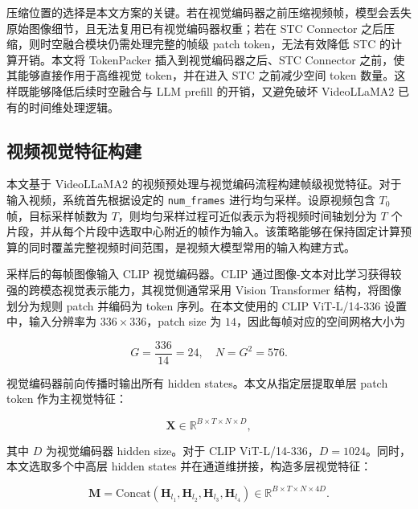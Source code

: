 \par 压缩位置的选择是本文方案的关键。若在视觉编码器之前压缩视频帧，模型会丢失原始图像细节，且无法复用已有视觉编码器权重；若在 STC Connector 之后压缩，则时空融合模块仍需处理完整的帧级 patch token，无法有效降低 STC 的计算开销。本文将 TokenPacker 插入到视觉编码器之后、STC Connector 之前，使其能够直接作用于高维视觉 token，并在进入 STC 之前减少空间 token 数量。这样既能够降低后续时空融合与 LLM prefill 的开销，又避免破坏 VideoLLaMA2 已有的时间维处理逻辑。

\subsection{视频视觉特征构建}

\par 本文基于 VideoLLaMA2 的视频预处理与视觉编码流程构建帧级视觉特征。对于输入视频，系统首先根据设定的 \texttt{num\_frames} 进行均匀采样。设原视频包含 $T_0$ 帧，目标采样帧数为 $T$，则均匀采样过程可近似表示为将视频时间轴划分为 $T$ 个片段，并从每个片段中选取中心附近的帧作为输入。该策略能够在保持固定计算预算的同时覆盖完整视频时间范围，是视频大模型常用的输入构建方式。

\par 采样后的每帧图像输入 CLIP 视觉编码器。CLIP 通过图像-文本对比学习获得较强的跨模态视觉表示能力\cite{clip2021}，其视觉侧通常采用 Vision Transformer 结构，将图像划分为规则 patch 并编码为 token 序列\cite{vit2021}。在本文使用的 CLIP ViT-L/14-336 设置中，输入分辨率为 $336 \times 336$，patch size 为 $14$，因此每帧对应的空间网格大小为

\begin{equation}
    \label{equ:method-raw-grid}
    G = \frac{336}{14}=24,\quad N = G^2 = 576.
\end{equation}

\par 视觉编码器前向传播时输出所有 hidden states。本文从指定层提取单层 patch token 作为主视觉特征：

\begin{equation}
    \label{equ:method-single-feature}
    \mathbf{X} \in \mathbb{R}^{B \times T \times N \times D},
\end{equation}

\par 其中 $D$ 为视觉编码器 hidden size。对于 CLIP ViT-L/14-336，$D=1024$。同时，本文选取多个中高层 hidden states 并在通道维拼接，构造多层视觉特征：

\begin{equation}
    \label{equ:method-multi-feature}
    \mathbf{M} = \mathrm{Concat}(\mathbf{H}_{l_1},\mathbf{H}_{l_2},\mathbf{H}_{l_3},\mathbf{H}_{l_4})
    \in \mathbb{R}^{B \times T \times N \times 4D}.
\end{equation}

